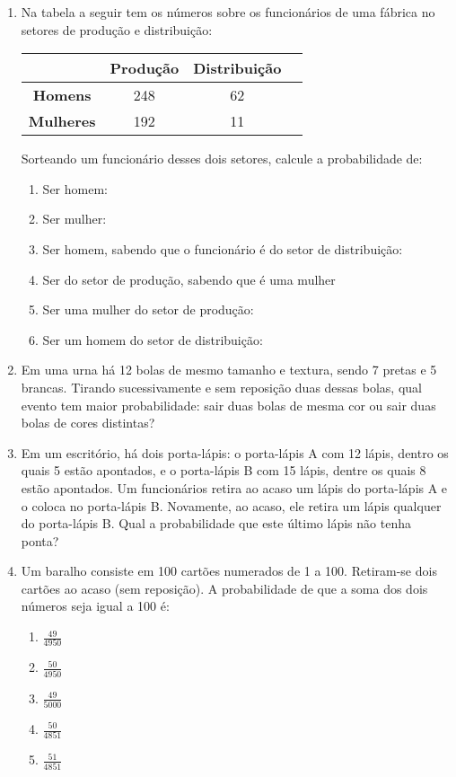 \documentclass[twocolumn,oneside,a4paper,12pt]{article}
\begin{document}
\pagestyle{empty}
\cabecalho

\begin{enumerate}
\item Na tabela a seguir tem os números sobre os funcionários de uma fábrica no setores de produção e distribuição:

\begin{tabular}{cccc}
\hline
 & \textbf{Produção} & \textbf{Distribuição} \\ 
\hline
\textbf{Homens} & 248 & 62 \\ 
\textbf{Mulheres} & 192 & 11 \\ 
\hline
\end{tabular} 

Sorteando um funcionário desses dois setores, calcule a probabilidade de:

\begin{enumerate}
\item Ser homem:
\item Ser mulher:
\item Ser homem, sabendo que o funcionário é do setor de distribuição:
\item Ser do setor de produção, sabendo que é uma mulher
\item Ser uma mulher do setor de produção:
\item Ser um homem do setor de distribuição:
\end{enumerate}

\item Em uma urna há 12 bolas de mesmo tamanho e textura, sendo 7 pretas e 5 brancas. Tirando sucessivamente e sem reposição duas dessas bolas, qual evento tem maior probabilidade: sair duas bolas de mesma cor ou sair duas bolas de cores distintas?

\item Em um escritório, há dois porta-lápis: o porta-lápis A com 12 lápis, dentro os quais 5 estão apontados, e o porta-lápis B com 15 lápis, dentre os quais 8 estão apontados. Um funcionários retira ao acaso um lápis do porta-lápis A e o coloca no porta-lápis B. Novamente, ao acaso, ele retira um lápis qualquer do porta-lápis B. Qual a probabilidade que este último lápis não tenha ponta? 

\item Um baralho consiste em 100 cartões numerados de 1 a 100. Retiram-se dois cartões ao acaso (sem reposição). A probabilidade de que a soma dos dois números seja igual a 100 é:
\begin{enumerate}
\item \(\frac{49}{4950}\)
\item \(\frac{50}{4950}\)
\item \(\frac{49}{5000}\)
\item \(\frac{50}{4851}\)
\item \(\frac{51}{4851}\)
\end{enumerate}


\end{enumerate}
\end{document}

